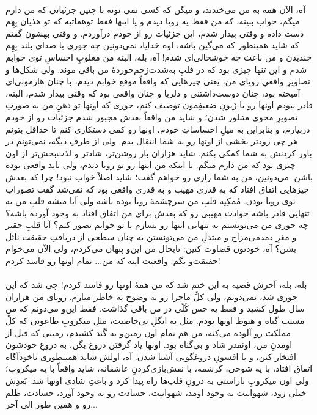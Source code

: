 \documentclass[12pt]{book}
\begin{document}
    \paragraph{}
    آه، الآن همه به من می‌خندند، و میگن که کسی نمی تونه با چنین جزئیاتی که من دارم میگم، خواب ببینه، که من فقط یه رویا دیدم و یا اینها فقط توهماتیه که تو هذیان بِهِم دست داده و وقتی بیدار شدم، این جزئیات رو از خودم درآوردم. و وقتی بهشون گفتم که شاید همینطور که می‌گین باشه، اوه خدایا، نمی‌دونین چه جوری با صدای بلند بِهِم خندیدن و من باعث چه خوشحالی‌ای شدم! آه، بله، البته من مغلوبِ احساسِ توی خوابم شدم و این تنها چیزی بود که در قلبِ به‌شدت‌زخم‌خوردهٔ من باقی موند. ولی شکل‌ها و تصاویرِ واقعیِ رویای من، یعنی چیزهایی که واقعاً موقع خوابم دیدم، با چنان ‌هارمونی‌ای آمیخته بود، چنان دوست‌داشتنی و دلربا و چنان واقعی بود که وقتی بیدار شدم، البته، قادر نبودم اونها رو با زَبونِ ضعیفِمون توصیف کنم، جوری که اونها تو ذهنِ من به صورتِ تصویرِ محوی متبلور شدن؛ و شاید من واقعاً بعدش مجبور شدم جزئیات رو از خودم دربیارم، و بنابراین به میلِ احساساتِ خودم، اونها رو کمی دستکاری کنم تا حداقل بتونم هر چی زودتر بخشی از اونها رو به شما انتقال بدم. ولی از طرفِ دیگه، نمی‌تونم در باور کردنش به شما کمکی بکنم. شاید هزاران بار روشن‌تر، شادتر و لذت‌بخش‌تر از اون چیزی بود که من دارم میگم. با اینکه من اینها رو تو رویا دیدم، ولی باید واقعی بوده باشن. می‌دونین، من به شما رازی رو خواهم گفت؛ شاید اصلاً خواب نبود! چرا که بعدش چیزهایی اتفاق افتاد که به قدری مهیب و به قدری واقعی بود که نمی‌شد گفت تصوراتِ توی رویا بودن. مُمکِنِه قلبِ من سرچشمهٔ رویا بوده باشه ولی آیا میشه قلبِ من به تنهایی قادر باشه حوادث مهیبی رو که بعدش برای من اتفاق افتاد به وجود آورده باشه؟ چه جوری من می‌تونستم به تنهایی اینها رو بسازم یا تو خوابم تصور کنم؟ آیا قلبِ حقیر و مغزِ دمدمی‌مزاج و مبتذلِ من می‌تونستن به چنان سطحی از دریافتِ حقیقت نائل بشن؟ آه، خودتون قضاوت کنین: تابحال من این‌و پنهان می‌کردم، ولی الآن می‌خوام حقیقت‌و بگم. واقعیت اینه که من... تمام اونها رو فاسد کردم!

    \paragraph{}
    بله، بله، آخرش قضیه به این ختم شد که من همهٔ اونها رو فاسد کردم! چی شد که این جوری شد، نمی‌دونم، ولی کلِّ ماجرا رو به وضوح به خاطر میارم. رویای من هزاران سال طول کشید و فقط یه حس کُلّی در من باقی گذاشت. فقط این‌و می‌دونم که من مسبب گناه و هبوط اونها بودم. مثل یه انگلِ بی‌خاصیت، مثل میکروبِ طاعونی که کلِّ مملکت رو آلوده می‌کنه، من هم تمام اون زمین‌و به گَند کشیدم، زمینی که قبل از اومدنِ من، اونقدر شاد و بی‌گناه بود. اونها یاد گرفتن دروغ بگن، به دروغِ خودشون افتخار کنن، و با افسونِ دروغگویی آشنا شدن. آه، اولش شاید همینطوری ناخودآگاه اتفاق افتاد، با یه شوخی، کرشمه، با نقش‌بازی‌کردنِ عاشقانه، شاید واقعاً با یه میکروب؛ ولی اون میکروبِ ناراستی به درونِ قلب‌ها راه پیدا کرد و باعثِ شادی اونها شد. بَعدِش خیلی زود، شهوانیت به وجود اومد، شهوانیت، حسادت رو به وجود آورد، حسادت، ظلم رو و همین طور الی آخر...
\end{document}
